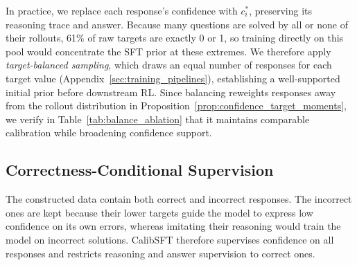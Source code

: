 \documentclass{article} %
\begin{document}
In practice, we replace each response's confidence with $c_i^*$, preserving its reasoning trace and answer.
Because many questions are solved by all or none of their rollouts, 61\% of raw targets are exactly 0 or 1, so training directly on this pool would concentrate the SFT prior at these extremes.
We therefore apply \emph{target-balanced sampling}, which draws an equal number of responses for each target value (Appendix~\ref{sec:training_pipelines}), establishing a well-supported initial prior before downstream RL.
Since balancing reweights responses away from the rollout distribution in Proposition~\ref{prop:confidence_target_moments}, we verify in Table~\ref{tab:balance_ablation} that it maintains comparable calibration while broadening confidence support.



\subsection{Correctness-Conditional Supervision}

The constructed data contain both correct and incorrect responses. The
incorrect ones are kept because their lower targets guide the model to
express low confidence on its own errors, whereas imitating their
reasoning would train the model on incorrect solutions.
CalibSFT therefore supervises confidence on all responses and restricts
reasoning and answer supervision to correct ones.
\end{document}
